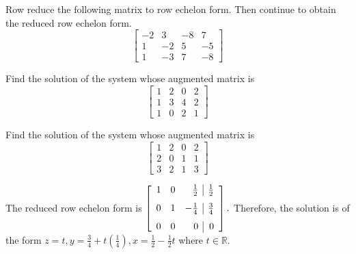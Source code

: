 \documentclass{ximera}
\begin{document}
\begin{problem}\label{prb:2.24} Row reduce the following matrix to row echelon form. Then continue to obtain the reduced row echelon form.
\begin{equation*}
\left[
\begin{array}{rrrr}
-2 & 3 & -8 & 7 \\
1 & -2 & 5 & -5 \\
1 & -3 & 7 & -8
\end{array}
\right]
\end{equation*}
\end{problem}

\begin{problem}\label{prb:2.25} Find the solution of the system whose augmented matrix is
\begin{equation*}
\left[
\begin{array}{rrr|r}
1 & 2 & 0 & 2 \\
1 & 3 & 4 & 2 \\
1 & 0 & 2 & 1
\end{array}
\right]
\end{equation*}
\end{problem}

\begin{problem}\label{prb:2.26} Find the solution of the system whose augmented matrix is
\begin{equation*}
\left[
\begin{array}{rrr|r}
1 & 2 & 0 & 2 \\
2 & 0 & 1 & 1 \\
3 & 2 & 1 & 3
\end{array}
\right]
\end{equation*}
\begin{hint}
The reduced row echelon form is $\left[
\begin{array}{rrr|r}
1 & 0 & \vspace{0.05in}\frac{1}{2} & \vspace{0.05in}\frac{1}{2} \\
0 & 1 & -\vspace{0.05in}\frac{1}{4} & \vspace{0.05in}\frac{3}{4} \\
0 & 0 & 0 & 0
\end{array}
\right] .$ Therefore, the solution is of the form $z=t,y=\frac{3}{4}+t\left(
\frac{1}{4}\right) ,x=\frac{1}{2}-\frac{1}{2}t$ where $t\in \mathbb{R}$.
\end{hint}
\end{problem}
\end{document}
